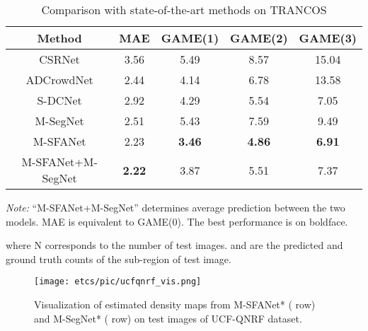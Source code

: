\documentclass[10pt, conference, a4paper]{IEEEtran}
\begin{document}
\setlength{\tabcolsep}{2pt}
\begin{table}
\begin{center}
\small
\caption{Comparison with state-of-the-art methods on TRANCOS \cite{guerrero2015extremely}}
\begin{tabular}{c|c|c|c|c}
\hline
Method & MAE & GAME(1) & GAME(2) & GAME(3)\\
\hline
CSRNet \cite{li2018csrnet} & 3.56 & 5.49 & 8.57 & 15.04\\
ADCrowdNet \cite{liu2019adcrowdnet} & 2.44 & 4.14 & 6.78 & 13.58\\
S-DCNet \cite{xiong2019open} & 2.92 & 4.29 & 5.54 & 7.05\\
\hline
M-SegNet & 2.51 & 5.43 & 7.59 & 9.49\\
M-SFANet & 2.23 & \textbf{3.46} & \textbf{4.86} & \textbf{6.91}\\
M-SFANet+M-SegNet & \textbf{2.22} & 3.87 & 5.51 & 7.37\\
\hline
\end{tabular}
\label{table:tranres}
\end{center}
\footnotesize\emph{Note:} ``M-SFANet+M-SegNet'' determines average prediction between the two models. MAE is equivalent to GAME(0). The best performance is on boldface.
\end{table}
%
 where N corresponds to the number of test images.  and  are the predicted and ground truth counts of the  sub-region of  test image.

\begin{figure}
    \centering
    \texttt{[image: etcs/pic/ucfqnrf\_vis.png]}
    \caption{Visualization of estimated density maps from M-SFANet* ( row) and M-SegNet* ( row) on test images of UCF-QNRF \cite{idrees2018composition} dataset.}
    \label{fig:ucfqnrf}
\end{figure}
\end{document}

